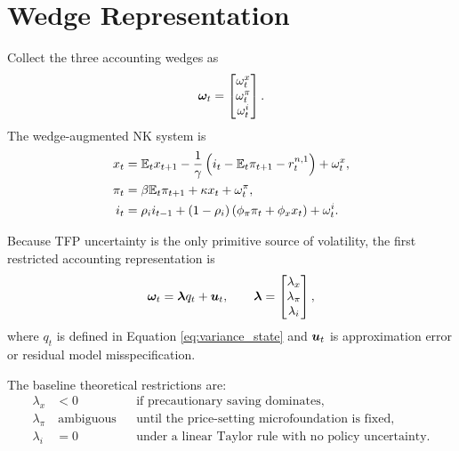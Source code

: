 \section{Wedge Representation}

Collect the three accounting wedges as
\begin{equation}
    \boldsymbol{\omega}_t
    =
    \begin{bmatrix}
        \omega^x_t \\
        \omega^\pi_t \\
        \omega^i_t
    \end{bmatrix}.
    \label{eq:wedge_vector}
\end{equation}
The wedge-augmented NK system is
\begin{align}
    x_t
    &=
    \mathbb{E}_t x_{t+1}
    -
    \frac{1}{\gamma}
    \left(
        i_t-\mathbb{E}_t\pi_{t+1}-r^{n,1}_t
    \right)
    +
    \omega^x_t,
    \label{eq:wedge_system_is}
    \\
    \pi_t
    &=
    \beta \mathbb{E}_t \pi_{t+1}
    +
    \kappa x_t
    +
    \omega^\pi_t,
    \label{eq:wedge_system_nkpc}
    \\
    i_t
    &=
    \rho_i i_{t-1}
    +
    (1-\rho_i)
    \left(
        \phi_\pi \pi_t+\phi_x x_t
    \right)
    +
    \omega^i_t.
    \label{eq:wedge_system_policy}
\end{align}

Because TFP uncertainty is the only primitive source of volatility, the first
restricted accounting representation is
\begin{equation}
    \boldsymbol{\omega}_t
    =
    \boldsymbol{\lambda} q_t
    +
    \boldsymbol{u}_t,
    \qquad
    \boldsymbol{\lambda}
    =
    \begin{bmatrix}
        \lambda_x \\
        \lambda_\pi \\
        \lambda_i
    \end{bmatrix},
    \label{eq:rank_one_wedge_restriction}
\end{equation}
where \(q_t\) is defined in Equation \eqref{eq:variance_state} and
\(\boldsymbol{u}_t\) is approximation error or residual model misspecification.

The baseline theoretical restrictions are:
\begin{align}
    \lambda_x &< 0
    && \text{if precautionary saving dominates,}
    \label{eq:lambda_x_prediction}
    \\
    \lambda_\pi &\ \text{ambiguous}
    && \text{until the price-setting microfoundation is fixed,}
    \label{eq:lambda_pi_prediction}
    \\
    \lambda_i &= 0
    && \text{under a linear Taylor rule with no policy uncertainty.}
    \label{eq:lambda_i_prediction}
\end{align}


